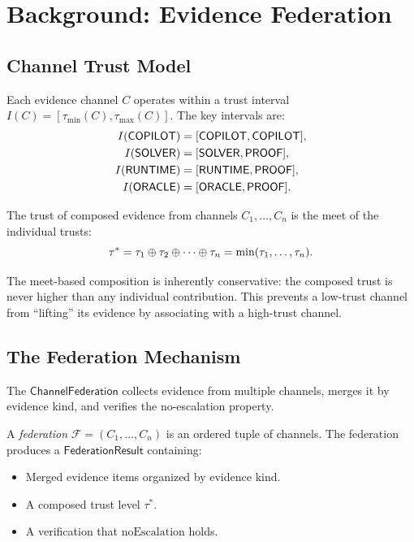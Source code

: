 \documentclass[11pt]{article}
\newcommand{\FedResult}{\mathsf{FederationResult}}
\newcommand{\ChanFed}{\mathsf{ChannelFederation}}
\newcommand{\NoEscal}{\mathrm{noEscalation}}
\begin{document}
\section{Background: Evidence Federation}
\label{sec:background}

\subsection{Channel Trust Model}
\label{sec:background:trust}

Each evidence channel $C$ operates within a trust interval
$I(C) = [\tau_{\min}(C), \tau_{\max}(C)]$.  The key intervals are:
\begin{align*}
  I(\mathsf{COPILOT}) &= [\mathsf{COPILOT}, \mathsf{COPILOT}], \\
  I(\mathsf{SOLVER}) &= [\mathsf{SOLVER}, \mathsf{PROOF}], \\
  I(\mathsf{RUNTIME}) &= [\mathsf{RUNTIME}, \mathsf{PROOF}], \\
  I(\mathsf{ORACLE}) &= [\mathsf{ORACLE}, \mathsf{PROOF}].
\end{align*}

\begin{definition}
\label{def:trust-comp}
The trust of composed evidence from channels $C_1, \ldots, C_n$
is the meet of the individual trusts:
\[
  \tau^* = \tau_1 \oplus \tau_2 \oplus \cdots \oplus \tau_n
  = \min(\tau_1, \ldots, \tau_n).
\]
\end{definition}

\begin{remark}
\label{rem:conservative}
The meet-based composition is inherently conservative: the
composed trust is never higher than any individual contribution.
This prevents a low-trust channel from ``lifting'' its evidence
by associating with a high-trust channel.
\end{remark}

\subsection{The Federation Mechanism}
\label{sec:background:federation}

The $\ChanFed$ collects evidence from multiple channels, merges
it by evidence kind, and verifies the no-escalation property.

\begin{definition}[Federation]
\label{def:federation}
A \emph{federation} $\mathcal{F} = (C_1, \ldots, C_n)$ is an
ordered tuple of channels.  The federation produces a
$\FedResult$ containing:
\begin{itemize}[leftmargin=2em]
\item Merged evidence items organized by evidence kind.
\item A composed trust level $\tau^*$.
\item A verification that $\NoEscal$ holds.
\end{itemize}
\end{definition}
\end{document}
